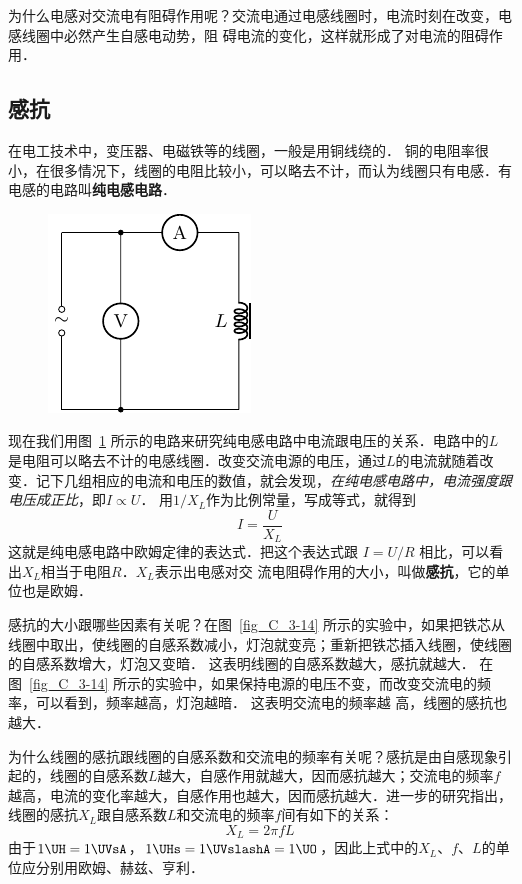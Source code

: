 为什么电感对交流电有阻碍作用呢？交流电通过电感线圈时，电流时刻在改变，电感线圈中必然产生自感电动势，阻
碍电流的变化，这样就形成了对电流的阻碍作用．

\subsection{感抗}

在电工技术中，变压器、电磁铁等的线圈，一般是用铜线绕的．
铜的电阻率很小，在很多情况下，线圈的电阻比较小，可以略去不计，而认为线圈只有电感．有电感的电路叫\textbf{纯电感电路}．
\begin{figure}[htbp]
    \centering
    \includegraphics{fig/C/3-15.pdf}
    \caption{}\label{fig_C_3-15}
\end{figure}
	
现在我们用图~\ref{fig_C_3-15} 所示的电路来研究纯电感电路中电流跟电压的关系．电路中的$L$是电阻可以略去不计的电感线圈．改变交流电源的电压，通过$L$的电流就随着改变．记下几组相应的电流和电压的数值，就会发现，\textit{在纯电感电路中，电流强度跟电压成正比}，即$I\propto U$． 用$1/X_L$作为比例常量，写成等式，就得到
\[I=\frac{U}{X_L} \]
这就是纯电感电路中欧姆定律的表达式．把这个表达式跟
$I=U/R$
相比，可以看出$X_L$相当于电阻$R$．$X_L$表示出电感对交
流电阻碍作用的大小，叫做\textbf{感抗}，它的单位也是欧姆．

感抗的大小跟哪些因素有关呢？在图~\ref{fig_C_3-14} 所示的实验中，如果把铁芯从线圈中取出，使线圈的自感系数减小，灯泡就变亮；重新把铁芯插入线圈，使线圈的自感系数增大，灯泡又变暗．
这表明线圈的自感系数越大，感抗就越大．
在图~\ref{fig_C_3-14} 所示的实验中，如果保持电源的电压不变，而改变交流电的频率，可以看到，频率越高，灯泡越暗．
这表明交流电的频率越	
高，线圈的感抗也越大．

为什么线圈的感抗跟线圈的自感系数和交流电的频率有关呢？感抗是由自感现象引起的，线圈的自感系数$L$越大，自感作用就越大，因而感抗越大；交流电的频率$f$越高，电流的变化率越大，自感作用也越大，因而感抗越大．进一步的研究指出，线圈的感抗$X_L$跟自感系数$L$和交流电的频率$f$间有如下的关系：
\[X_L=2\pi fL\]
由于$1 \UH=1\UVsA$，$1\UHs=1\UVslashA=1\UO$，因此上式中的$X_L$、$f$、$L$的单位应分别用欧姆、赫兹、亨利．

